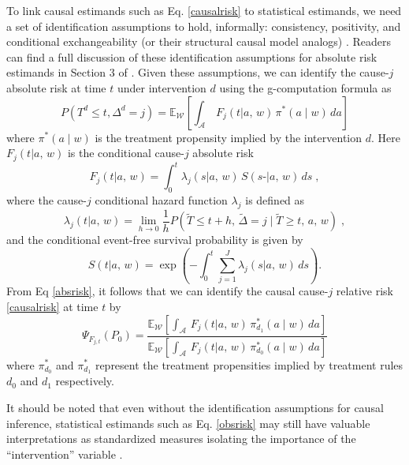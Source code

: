 To link causal estimands such as Eq. \eqref{causalrisk} to statistical estimands, we need a set of identification assumptions to hold, informally: consistency, positivity, and conditional exchangeability (or their structural causal model analogs) . Readers can find a full discussion of these identification assumptions for absolute risk estimands in Section 3 of \citep{rytgaard_targeted_2022}. Given these assumptions, we can identify the cause-\(j\) absolute risk at time \(t\) under intervention \(d\) using the g-computation formula \citep{robins_new_1986} as \begin{equation}
P(T^d \leq t, \Delta^d = j) = \mathbb{E}_{\mathcal{{W}}} \left[ \int_{\mathcal{A}} \,  F_j(t {\mid a,\,{w}}) \, {\pi}^* (a \mid {w}) \, da \right] \label{absrisk}
\end{equation} where \({\pi}^*(a \mid {w})\) is the treatment propensity implied by the intervention \(d\). Here \(F_j(t {\mid a,\,{w}})\) is the conditional cause-\(j\) absolute risk \begin{equation*}
F_j(t {\mid a,\,{w}}) = \int_0^t \lambda_j(s {\mid a,\,{w}}) \, S(s\texttt{-} {\mid a,\,{w}}) \, ds \;,
\end{equation*} where the cause-\(j\) conditional hazard function \(\lambda_j\) is defined as \begin{equation*}
\lambda_j(t {\mid a,\,{w}}) = \lim\limits_{h \to 0} \frac{1}{h} P(\widetilde T\leq t + h,\, {\tilde{\Delta}}= j \mid \widetilde T\geq t,\, a,\, {{w}}) \;,
\end{equation*} and the conditional event-free survival probability is given by \begin{equation}
S(t {\mid a,\,{w}}) = \exp\left(-\int^{t}_{0} \sum\limits_{j=1}^{J} \lambda_j(s {\mid a,\,{w}}) \, ds \right).\label{evfreesurv}
\end{equation} From Eq \eqref{absrisk}, it follows that we can identify the causal cause-\(j\) relative risk \eqref{causalrisk} at time \(t\) by \begin{equation}
\Psi_{F_{j,t}}(P_0) = \frac{\mathbb{E}_{\mathcal{{W}}} \left[ \int_{\mathcal{A}} \,  F_j(t {\mid a,\,{w}}) \, {\pi}^*_{d_1} (a \mid {w}) \, da \right]}{\mathbb{E}_{\mathcal{{W}}} \left[ \int_{\mathcal{A}} \,  F_j(t {\mid a,\,{w}}) \, {\pi}^*_{d_0} (a \mid {w}) \, da \right]} \label{obsrisk}
\end{equation} where \({\pi}^*_{d_0}\) and \({\pi}^*_{d_1}\) represent the treatment propensities implied by treatment rules \(d_0\) and \(d_1\) respectively.

It should be noted that even without the identification assumptions for causal inference, statistical estimands such as Eq. \eqref{obsrisk} may still have valuable interpretations as standardized measures isolating the importance of the ``intervention'' variable \citep{laan_statistical_2006}.

